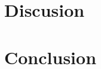 \documentclass[a4paper,12pt,twoside]{article}
\begin{document}


\pagebreak

\section{Discusion}

\pagebreak

\section{Conclusion}

\pagebreak


\end{document}
